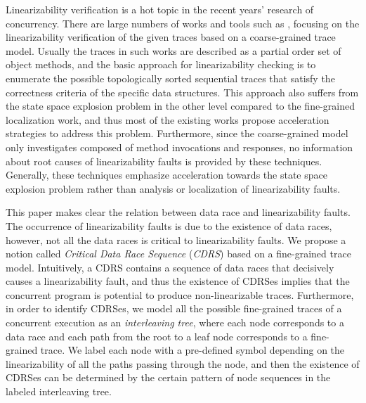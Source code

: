 \documentclass[runningheads]{llncs}
\begin{document}
Linearizability verification is a hot topic in the recent years' research of concurrency. There are large numbers of works and tools such as
\cite{DBLP:conf/popl/BouajjaniEEH15,DBLP:conf/pldi/BurckhardtDMT10,DBLP:conf/popl/BouajjaniEEH15,DBLP:conf/forte/HornK15a,DBLP:conf/sac/LongZ16,DBLP:journals/concurrency/Lowe17}, 
focusing on the linearizability verification of the given traces based on a coarse-grained trace model.
Usually the traces in such works are described as a partial order set of object methods, and the basic approach 
for linearizability checking is to enumerate the possible topologically sorted sequential traces that satisfy the correctness criteria of the specific data structures.
This approach also suffers from the state space explosion problem in the other level compared to the fine-grained localization work, and thus
most of the existing works propose acceleration strategies to address this problem.
Furthermore, since the coarse-grained model only investigates composed of method invocations and responses, 
no information about root causes of linearizability faults is provided by these techniques. 
Generally, these techniques emphasize acceleration towards the state space explosion problem rather than analysis or localization of linearizability faults.



 This paper makes clear the relation between data race and linearizability faults. 
 The occurrence of linearizability faults is due to the existence of data races, however, not all the data races is critical to linearizability faults.
 We propose a notion called \textit{Critical Data Race Sequence} (\textit{CDRS}) based on a fine-grained trace model. 
 Intuitively, a CDRS contains a sequence of data races that decisively causes a linearizability fault, 
 and thus the existence of CDRSes implies that the concurrent program is potential to produce non-linearizable traces. 
 Furthermore, in order to identify CDRSes, we model all the possible fine-grained traces of a concurrent execution as an \textit{interleaving tree}, 
 where each node corresponds to a data race and each path from the root to a leaf node corresponds to a fine-grained trace. 
 We label each node with a pre-defined symbol depending on the linearizability of all the paths passing through the node, and 
 then the existence of CDRSes can be determined by the certain pattern of node sequences in the labeled interleaving tree.
 
\end{document}

